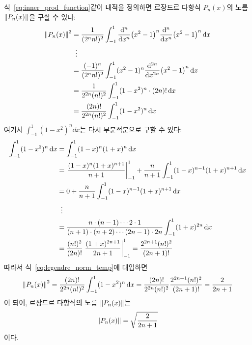 \documentclass[../engineering_mathematics_lecture_note.tex]{subfiles}
\begin{document}
\begin{remark}
    식~\ref{eq:inner_prod_function}\와 같이 내적을 정의하면 르장드르 다항식 $P_n(x)$의 노름 $\norm{P_n(x)}$을 구할 수 있다:
    \begin{align}
        \norm{P_n(x)}^2 &= \frac{1}{(2^n n!)^2} \int^1_{-1} \dv[n]{x} (x^2 - 1)^n \dv[n]{x} (x^2 - 1)^n \dd{x} \nonumber \\
                        &\vdotswithin{=}\nonumber \\
                        &= \frac{(-1)^n}{(2^n n!)^2} \int^1_{-1} (x^2 - 1)^n \dv[2n]{x} (x^2 - 1)^n \dd{x}\nonumber \\
                        &= \frac{1}{2^{2n} (n!)^2} \int^1_{-1} (1 - x^2)^n \cdot (2n)! \dd{x}\nonumber \\
                        &= \frac{(2n)!}{2^{2n} (n!)^2} \int^1_{-1} (1 - x^2)^n \dd{x}\label{eq:legendre_norm_temp}
    \end{align}
    여기서 $\int^1_{-1} (1 - x^2)^n \dd{x}$는 다시 부분적분으로 구할 수 있다:
    \begin{align*}
        \int^1_{-1} (1 - x^2)^n \dd{x} &= \int^1_{-1} (1 - x)^n (1 + x)^n \dd{x}\\
                                       &= \left.\frac{(1 - x)^n (1 + x)^{n + 1}}{n + 1} \right|^1_{-1} + \frac{n}{n + 1} \int^1_{-1} (1 - x)^{n - 1} (1 + x)^{n + 1} \dd{x}\\
                                       &= 0 + \frac{n}{n + 1} \int^1_{-1} (1 - x)^{n - 1} (1 + x)^{n + 1} \dd{x}\\
                                       &\vdotswithin{=}\\
                                       &= \frac{n \cdot (n - 1) \cdots 2 \cdot 1}{(n + 1) \cdot (n + 2) \cdots (2n - 1) \cdot 2n} \int^1_{-1} (1 + x)^{2n} \dd{x}\\
                                       &= \frac{(n!)^2}{(2n)!} \left. \frac{(1 + x)^{2n + 1}}{2n + 1} \right|^1_{-1} = \frac{2^{2n + 1} (n!)^2}{(2n + 1)!} 
    \end{align*}
    따라서 식~\ref{eq:legendre_norm_temp}에 대입하면
    \begin{equation*}
        \norm{P_n(x)}^2 = \frac{(2n)!}{2^{2n} (n!)^2} \int^1_{-1} (1 - x^2)^n \dd{x} = \frac{(2n)!}{2^{2n} (n!)^2} \frac{2^{2n + 1} (n!)^2}{(2n + 1)!} = \frac{2}{2n + 1}
    \end{equation*}
    이 되어, 르장드르 다항식의 노름 $\norm{P_n(x)}$는
    \begin{equation*}
        \norm{P_n(x)} = \sqrt{\frac{2}{2n + 1}}
    \end{equation*}
    이다.
\end{remark}
\end{document}
